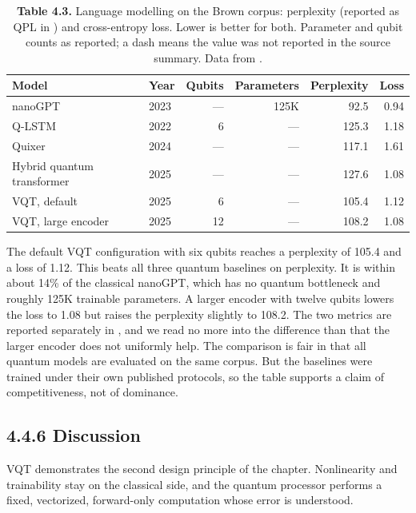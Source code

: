 \documentclass{report}
\theoremstyle{plain}
\theoremstyle{definition}
\theoremstyle{remark}
\begin{document}
\begin{table}[htbp]
\caption{\textbf{Table 4.3.} Language modelling on the Brown corpus: perplexity (reported as QPL in \cite{guo2025vqt}) and cross-entropy loss. Lower is better for both. Parameter and qubit counts as reported; a dash means the value was not reported in the source summary. Data from \cite{guo2025vqt}.}\label{tab:qml:vqt-lm}
 
\small
\begin{tabular}{llrrrr}
\toprule
Model & Year & Qubits & Parameters & Perplexity & Loss \\
\midrule
nanoGPT \cite{karpathy2023nanogpt} & 2023 & --- & 125K & 92.5 & 0.94 \\
Q-LSTM \cite{chen2022qlstm} & 2022 & 6 & --- & 125.3 & 1.18 \\
Quixer \cite{khatri2024quixer} & 2024 & --- & --- & 117.1 & 1.61 \\
Hybrid quantum transformer & 2025 & --- & --- & 127.6 & 1.08 \\
VQT, default & 2025 & 6 & --- & 105.4 & 1.12 \\
VQT, large encoder & 2025 & 12 & --- & 108.2 & 1.08 \\
\bottomrule
\end{tabular}
\end{table}

The default VQT configuration with six qubits reaches a perplexity of 105.4 and a loss of 1.12. This beats all three quantum baselines on perplexity. It is within about 14\% of the classical nanoGPT, which has no quantum bottleneck and roughly 125K trainable parameters. A larger encoder with twelve qubits lowers the loss to 1.08 but raises the perplexity slightly to 108.2. The two metrics are reported separately in \cite{guo2025vqt}, and we read no more into the difference than that the larger encoder does not uniformly help. The comparison is fair in that all quantum models are evaluated on the same corpus. But the baselines were trained under their own published protocols, so the table supports a claim of competitiveness, not of dominance.

\subsection{4.4.6 Discussion}\label{sec:qml:vqt:discussion}

VQT demonstrates the second design principle of the chapter. Nonlinearity and trainability stay on the classical side, and the quantum processor performs a fixed, vectorized, forward-only computation whose error is understood.
\end{document}
